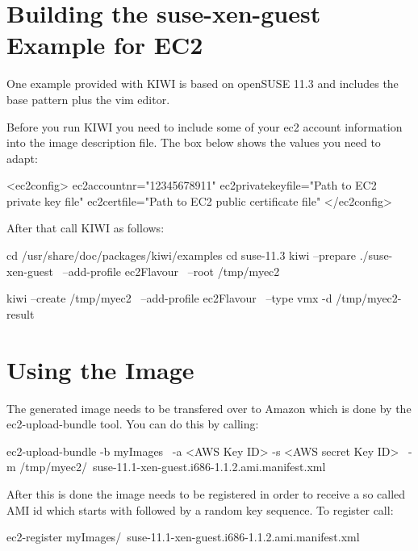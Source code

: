 \section{Building the suse-xen-guest Example for EC2}

One example provided with KIWI is based on openSUSE 11.3 and
includes the base pattern plus the vim editor.

Before you run KIWI you need to include some of your ec2 account
information into the image description  file. The box
below shows the values you need to adapt:

\begin{xml}
<ec2config>
  ec2accountnr="12345678911"
  ec2privatekeyfile="Path to EC2 private key file"
  ec2certfile="Path to EC2 public certificate file"
</ec2config>
\end{xml}

After that call KIWI as follows:

\begin{Command}{13cm}
cd /usr/share/doc/packages/kiwi/examples
cd suse-11.3
kiwi --prepare ./suse-xen-guest \
     --add-profile ec2Flavour \
     --root /tmp/myec2
\end{Command}

\begin{Command}{13cm}
kiwi --create /tmp/myec2 \
     --add-profile ec2Flavour \
     --type vmx -d /tmp/myec2-result
\end{Command}

\section{Using the Image}
The generated image needs to be transfered over to Amazon which is
done by the ec2-upload-bundle tool. You can do this by calling:

\begin{Command}{13cm}
ec2-upload-bundle -b myImages \
 -a <AWS Key ID> -s <AWS secret Key ID> \
 -m /tmp/myec2/\
    suse-11.1-xen-guest.i686-1.1.2.ami.manifest.xml
\end{Command}

After this is done the image needs to be registered in order to
receive a so called AMI id which starts with  followed
by a random key sequence. To register call:

\begin{Command}{13cm}
ec2-register myImages/\
    suse-11.1-xen-guest.i686-1.1.2.ami.manifest.xml
\end{Command}

